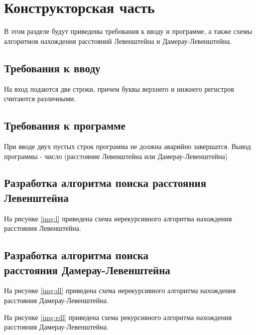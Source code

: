 \chapter{Конструкторская часть}
В этом разделе будут приведены требования к вводу и программе, а также схемы алгоритмов нахождения расстояний Левенштейна и Дамерау-Левенштейна.

\section{Требования к вводу}
На вход подаются две строки, причем буквы верхнего и нижнего регистров считаются различными.

\section{Требования к программе}
При вводе двух пустых строк программа не должна аварийно завершатся. Вывод программы - число (расстояние Левенштейна или Дамерау-Левенштейна)

\section{Разработка алгоритма поиска расстояния Левенштейна}

На рисунке \ref{img:l} приведена схема нерекурсивного алгоритма нахождения расстояния Левенштейна.


\newpage

\section{Разработка алгоритма поиска \\ расстояния Дамерау-Левенштейна}

На рисунке \ref{img:dl} приведена схема нерекурсивного алгоритма нахождения расстояния Дамерау-Левенштейна.


\newpage

На рисунке \ref{img:rdl} приведена схема рекурсивного алгоритма нахождения расстояния Дамерау-Левенштейна.


\newpage

